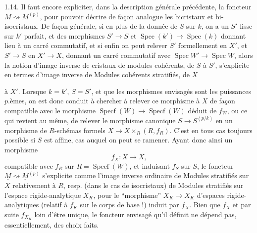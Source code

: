 1.14. Il faut encore expliciter, dans la description générale précédente, la  foncteur $M\rightsquigarrow M^{(p)}$, pour pouvoir décrire de façon analogue les bicristaux et bi-isocristaux. De façon générale, si en plus de la donnée de $S$ sur $k$, on a un $S'$ lisse sur $k'$ parfait, et des morphismes $S'\longrightarrow S$ et $\operatorname{Spec}(k')\longrightarrow\operatorname{Spec}(k)$ donnant lieu à un carré commutatif, et si enfin on peut relever $S'$ formellement en $X'$, et $S'\longrightarrow S$ en $X'\longrightarrow X$, donnant un carré commutatif avec $\operatorname{Spec}W'\longrightarrow\operatorname{Spec}W$, alors la notion d'image inverse de cristaux de modules cohérents, de $S$ à $S'$, s'explicite en termes d'image inverse de Modules cohérents stratifiés, de $X$


à $X'$. Lorsque $k=k'$, $S=S'$, et que les morphismes envisagés sont les puissances $p$.èmes, on est donc conduit à chercher à  relever ce morphisme à $X$ de façon compatible avec le morphisme $\operatorname{Specf}(W)\longrightarrow\operatorname{Specf}(W)$ déduit de $f_W$, ou ce qui revient au même, de relever le morphisme canonique $S\longrightarrow S^{(p/k)}$ en un morphisme de $R$-schémas formels $X\longrightarrow X\times_R(R,f_R)$. C'est en tous cas toujours possible si $S$ est affine, cas auquel on peut se ramener. Ayant donc ainsi un morphisme
\[
f_X:X\longrightarrow X,
\]
compatible avec $f_R$ sur $R=\operatorname{Specf}(W)$, et induisant $f_S$ sur $S$, le foncteur $\underline{M}\rightsquigarrow\underline{M}^{(p)}$ s'explicite comme l'image inverse ordinaire de Modules stratifiés sur $X$ relativement à $R$, resp. (dans le cas de isocristaux) de Modules stratifiés sur l'espace rigide-analytique $X_K$, pour le ``morphisme'' $X_K\longrightarrow X_K$ d'espaces rigide-analytiques (relatif à $f_K$ sur le corps de base !) induit par $f_X$. Bien que $f_X$ et par suite $f_{X_K}$  loin d'être unique, le foncteur envisagé qu'il définit ne dépend pas, essentiellement, des choix faits.

